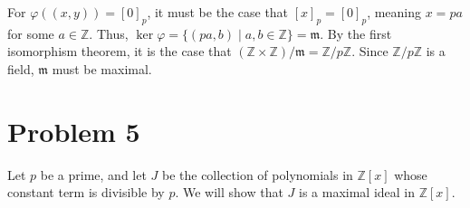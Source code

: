 \documentclass[8pt]{extarticle}
\newcommand{\Z}{\mathbb{Z}}
\begin{document}
  For $\varphi((x,y)) = [0]_{p}$, it must be the case that $[x]_{p} = [0]_{p}$, meaning $x = pa$ for some $a\in \Z$. Thus, $\ker\varphi = \{(pa,b)\mid a,b\in\Z\} = \mathfrak{m}$. By the first isomorphism theorem, it is the case that $(\Z\times\Z)/\mathfrak{m} = \Z/p\Z$. Since $\Z/p\Z$ is a field, $\mathfrak{m}$ must be maximal.
  \section{Problem 5}%
  Let $p$ be a prime, and let $J$ be the collection of polynomials in $\Z[x]$ whose constant term is divisible by $p$. We will show that $J$ is a maximal ideal in $\Z[x]$.
  
\end{document}
